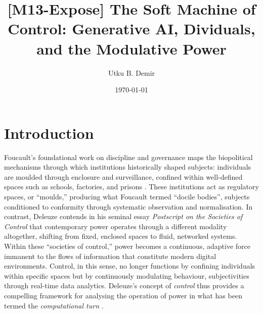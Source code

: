 
\title{[M13-Expose] The Soft Machine of Control: Generative AI, Dividuals, and the Modulative Power}
\author{Utku B. Demir}
\date{\today}


\maketitle

\section{Introduction}


Foucault’s foundational work on discipline and governance maps the biopolitical mechanisms through which institutions historically shaped subjects: individuals are moulded through enclosure and surveillance, confined within well-defined spaces such as schools, factories, and prisons \parencite[]{foucault2008a, Foucault1995}. These institutions act as regulatory spaces, or “moulds,” producing what Foucault termed “docile bodies”, subjects conditioned to conformity through systematic observation and normalisation. In contrast, Deleuze contends in his seminal essay \textit{Postscript on the Societies of Control} \parencite[]{deleuze1995a} that contemporary power operates through a different modality altogether, shifting from fixed, enclosed spaces to fluid, networked systems. Within these “societies of control,” power becomes a continuous, adaptive force immanent to the flows of information that constitute modern digital environments. Control, in this sense, no longer functions by confining individuals within specific spaces but by continuously modulating behaviour, subjectivities through real-time data analytics. Deleuze’s concept of \textit{control} thus provides a compelling framework for analysing the operation of power in what has been termed the \textit{computational turn} .

